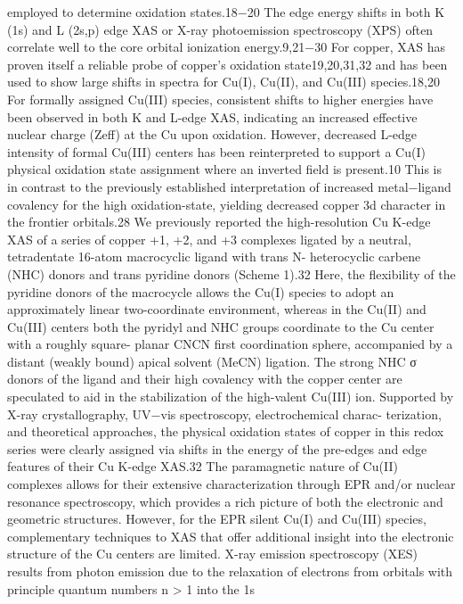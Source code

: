 \documentclass{article}
\begin{document}
employed to determine oxidation states.18−20 The edge energy
shifts in both K (1s) and L (2s,p) edge XAS or X-ray
photoemission spectroscopy (XPS) often correlate well to the
core orbital ionization energy.9,21−30 For copper, XAS has
proven itself a reliable probe of copper’s oxidation
state19,20,31,32 and has been used to show large shifts in
spectra for Cu(I), Cu(II), and Cu(III) species.18,20 For
formally assigned Cu(III) species, consistent shifts to higher
energies have been observed in both K and L-edge XAS,
indicating an increased eﬀective nuclear charge (Zeff) at the Cu
upon oxidation. However, decreased L-edge intensity of formal
Cu(III) centers has been reinterpreted to support a Cu(I)
physical oxidation state assignment where an inverted ﬁeld is
present.10 This is in contrast to the previously established
interpretation of increased metal−ligand covalency for the high
oxidation-state, yielding decreased copper 3d character in the
frontier orbitals.28
We previously reported the high-resolution Cu K-edge XAS
of a series of copper +1, +2, and +3 complexes ligated by a
neutral, tetradentate 16-atom macrocyclic ligand with trans N-
heterocyclic carbene (NHC) donors and trans pyridine donors
(Scheme 1).32 Here, the ﬂexibility of the pyridine donors of
the macrocycle allows the Cu(I) species to adopt an
approximately linear two-coordinate environment, whereas in
the Cu(II) and Cu(III) centers both the pyridyl and NHC
groups coordinate to the Cu center with a roughly square-
planar CNCN ﬁrst coordination sphere, accompanied by a
distant (weakly bound) apical solvent (MeCN) ligation. The
strong NHC σ donors of the ligand and their high covalency
with the copper center are speculated to aid in the stabilization
of the high-valent Cu(III) ion. Supported by X-ray
crystallography, UV−vis spectroscopy, electrochemical charac-
terization, and theoretical approaches, the physical oxidation
states of copper in this redox series were clearly assigned via
shifts in the energy of the pre-edges and edge features of their
Cu K-edge XAS.32
The paramagnetic nature of Cu(II) complexes allows for
their extensive characterization through EPR and/or nuclear
resonance spectroscopy, which provides a rich picture of both
the electronic and geometric structures. However, for the EPR
silent Cu(I) and Cu(III) species, complementary techniques to
XAS that oﬀer additional insight into the electronic structure of
the Cu centers are limited. X-ray emission spectroscopy (XES)
results from photon emission due to the relaxation of electrons
from orbitals with principle quantum numbers n > 1 into the 1s
\end{document}
